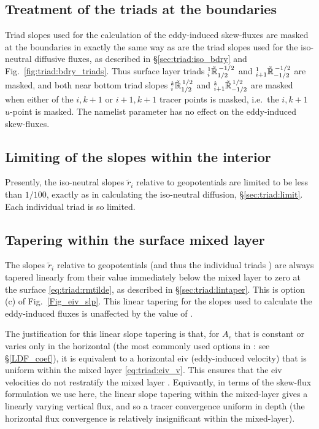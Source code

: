 \documentclass[NEMO_book]{subfiles}
\begin{document}
\subsection{Treatment of the triads at the boundaries}\label{sec:triad:skew_bdry}
Triad slopes  used for the calculation of the eddy-induced skew-fluxes
are masked at the boundaries in exactly the same way as are the triad
slopes  used for the iso-neutral diffusive fluxes, as
described in \S\ref{sec:triad:iso_bdry} and
Fig.~\ref{fig:triad:bdry_triads}. Thus surface layer triads
${}_{i}^{1}{\tilde{\mathbb{R}}}_{1/2}^{\,-1/2}$ and ${}_{i+1}^{1}{\tilde{\mathbb{R}}}_{-1/2}^{\,-1/2}$ are
masked, and both near bottom triad slopes ${}_{i}^{k}{\tilde{\mathbb{R}}}_{1/2}^{\,1/2}$
and ${}_{i+1}^{k}{\tilde{\mathbb{R}}}_{-1/2}^{\,1/2}$ are masked when either of the
$i,k+1$ or $i+1,k+1$ tracer points is masked, i.e.\ the $i,k+1$
$u$-point is masked. The namelist parameter  has
no effect on the eddy-induced skew-fluxes.

\subsection{ Limiting of the slopes within the interior}\label{sec:triad:limitskew}
Presently, the iso-neutral slopes $\tilde{r}_i$ relative
to geopotentials are limited to be less than $1/100$, exactly as in
calculating the iso-neutral diffusion, \S \ref{sec:triad:limit}. Each
individual triad  is so limited.

\subsection{Tapering within the surface mixed layer}\label{sec:triad:taperskew}
The slopes $\tilde{r}_i$ relative to
geopotentials (and thus the individual triads ) are always tapered linearly from their value immediately below the mixed layer to zero at the
surface \eqref{eq:triad:rmtilde}, as described in \S\ref{sec:triad:lintaper}. This is
option (c) of Fig.~\ref{Fig_eiv_slp}. This linear tapering for the
slopes used to calculate the eddy-induced fluxes is
unaffected by the value of .

The justification for this linear slope tapering is that, for $A_e$
that is constant or varies only in the horizontal (the most commonly
used options in \NEMO: see \S\ref{LDF_coef}), it is
equivalent to a horizontal eiv (eddy-induced velocity) that is uniform
within the mixed layer \eqref{eq:triad:eiv_v}. This ensures that the
eiv velocities do not restratify the mixed layer \citep{Treguier1997,
  Danabasoglu_al_2008}. Equivantly, in terms
of the skew-flux formulation we use here, the
linear slope tapering within the mixed-layer gives a linearly varying
vertical flux, and so a tracer convergence uniform in depth (the
horizontal flux convergence is relatively insignificant within the mixed-layer).
\end{document}
